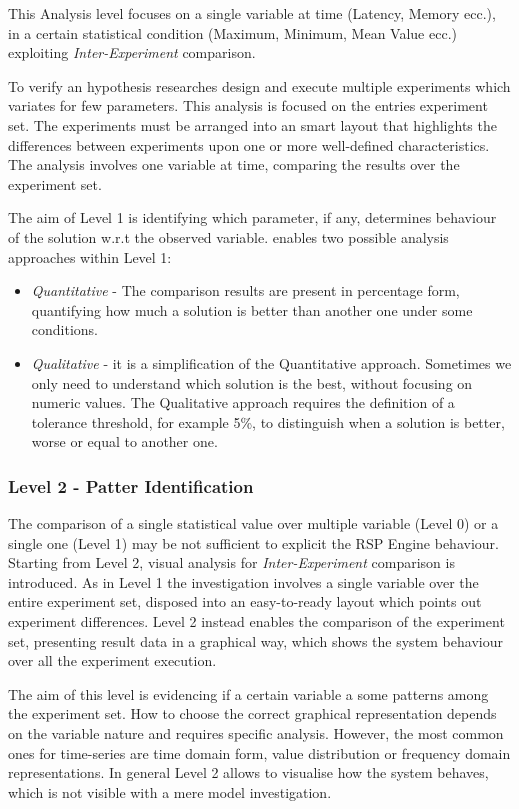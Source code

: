 This Analysis level focuses on a single variable at time (Latency, Memory ecc.), in a certain statistical condition (Maximum, Minimum, Mean Value ecc.) exploiting \textit{Inter-Experiment} comparison. 

To verify an hypothesis researches design and execute multiple experiments which variates for few parameters. This analysis is focused on the entries experiment set. The experiments must be arranged into an smart layout that highlights the differences between experiments upon one or more well-defined characteristics. The analysis involves one variable at time, comparing the results over the experiment set. 

The aim of Level 1 is identifying which parameter, if any, determines behaviour of the solution w.r.t the observed variable. \name enables two possible analysis approaches within Level 1:
\begin{itemize}
\item \textit{Quantitative} -  The comparison results are present in percentage form, quantifying how much a solution is better than another one under some conditions. 
\item \textit{Qualitative} - it is a simplification of the Quantitative approach. Sometimes we only need to understand which solution is the best, without focusing on numeric values. The Qualitative approach requires the definition of a tolerance threshold, for example 5\%, to distinguish when a solution is better, worse or equal to another one.
\end{itemize}

\subsubsection{Level 2 - Patter Identification}\label{sec:heaven-level2}

The comparison of a single statistical value over multiple variable (Level 0) or a single one (Level 1) may be not sufficient to explicit the RSP Engine behaviour. Starting from Level 2, visual analysis for \textit{Inter-Experiment} comparison is introduced. As in Level 1 the investigation involves a single variable over the entire experiment set, disposed into an easy-to-ready layout which points out experiment differences. Level 2 instead enables the comparison of the experiment set, presenting result data in a graphical way, which shows the system behaviour over all the experiment execution.

The aim of this level is evidencing if a certain variable a some patterns among the experiment set. How to choose the correct graphical representation depends on the variable nature and requires specific analysis. However, the most common ones for time-series are time domain form, value distribution or frequency domain representations. In general Level 2 allows to visualise how the system behaves, which is not visible with a mere model investigation.

